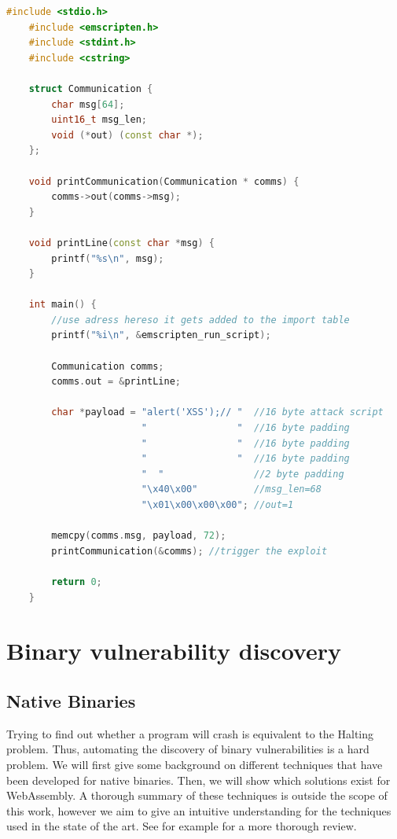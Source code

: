 \documentclass[sigconf]{acmart}
\begin{document}
\begin{lstlisting}[language=C++, label=fig:vuln_example_redirect_control_flow, caption={This code demonstrates a proof of concept of an exploit using indirect calls to influence control flow and implement cross site scripting. Taken with modifications from \cite{mcfadden_security_2018}}]
	#include <stdio.h>
	#include <emscripten.h>
	#include <stdint.h>
	#include <cstring>

	struct Communication {
		char msg[64];
		uint16_t msg_len;
		void (*out) (const char *);
	};

	void printCommunication(Communication * comms) {
		comms->out(comms->msg);
	}

	void printLine(const char *msg) {
		printf("%s\n", msg);
	}

	int main() {
		//use adress hereso it gets added to the import table
		printf("%i\n", &emscripten_run_script); 

		Communication comms;
		comms.out = &printLine;
		
		char *payload = "alert('XSS');// " 	//16 byte attack script
						"                " 	//16 byte padding
						"                " 	//16 byte padding
						"                " 	//16 byte padding
						"  "				//2 byte padding
						"\x40\x00"         	//msg_len=68
						"\x01\x00\x00\x00";	//out=1
						
		memcpy(comms.msg, payload, 72);
		printCommunication(&comms); //trigger the exploit
		
		return 0;
	}
\end{lstlisting}


\section{Binary vulnerability discovery}
\subsection{Native Binaries}
Trying to find out whether a program will crash is equivalent to the Halting problem. Thus, automating the discovery of binary vulnerabilities is a hard problem. We will first give some background on different techniques that have been developed for native binaries. Then, we will show which solutions exist for WebAssembly. A thorough summary of these techniques is outside the scope of this work, however we aim to give an intuitive understanding for the techniques used in the state of the art. See for example \cite{sun_new_2018} for a more thorough review.
\end{document}

